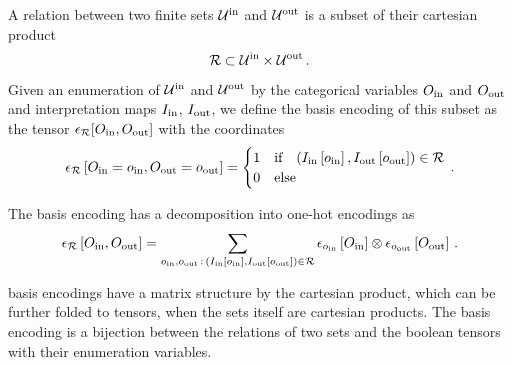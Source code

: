 \begin{definition}
    A relation between two finite sets $\mathcal{U}^{\mathrm{in}}$ and $\mathcal{U}^{\mathrm{out}}$ is a subset of their cartesian product
    \begin{align*}
        \mathcal{R} \subset \mathcal{U}^{\mathrm{in}} \times \mathcal{U}^{\mathrm{out}} \, .
    \end{align*}
    Given an enumeration of $\mathcal{U}^{\mathrm{in}}$ and $\mathcal{U}^{\mathrm{out}}$ by the categorical variables $O_{\mathrm{in}}$ and $O_{\mathrm{out}}$ and interpretation maps $I_{\mathrm{in}}$, $I_{\mathrm{out}}$, we define the basis encoding of this subset as the tensor $\epsilon_{\mathcal{R}}[O_{\mathrm{in}},O_{\mathrm{out}}]$ with the coordinates
    \begin{align*}
        \epsilon_{\mathcal{R}}\left[O_{\mathrm{in}}=o_{\mathrm{in}},O_{\mathrm{out}}=o_{\mathrm{out}}\right]
        = \begin{cases}
              1 & \text{if}\quad (I_{\mathrm{in}}\left[o_{\mathrm{in}}\right],I_{\mathrm{out}}\left[o_{\mathrm{out}}\right]) \in \mathcal{R} \\
              0 & \text{else}
        \end{cases} \, .
    \end{align*}
\end{definition}

The basis encoding has a decomposition into one-hot encodings as
\begin{align*}
    \epsilon_{\mathcal{R}}\left[O_{\mathrm{in}},O_{\mathrm{out}}\right]
    = \sum_{o_{\mathrm{in}},o_{\mathrm{out}} \,:\, (I_{\mathrm{in}}\left[o_{\mathrm{in}}\right],I_{\mathrm{out}}\left[o_{\mathrm{out}}\right]) \in \mathcal{R}}
    \epsilon_{o_{\mathrm{in}}}\left[O_{\mathrm{in}}\right]  \otimes \epsilon_{o_{\mathrm{out}}}\left[O_{\mathrm{out}}\right]  \, .
\end{align*}

basis encodings have a matrix structure by the cartesian product, which can be further folded to tensors, when the sets itself are cartesian products.
The basis encoding is a bijection between the relations of two sets and the boolean tensors with their enumeration variables.

%



